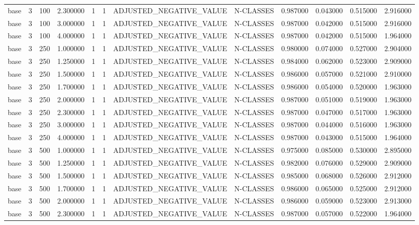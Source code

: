 \begin{tabular}{lrrrllllrrrr}
base & 3 & 100 & 2.300000 & 1 & 1 & ADJUSTED_NEGATIVE_VALUE & N-CLASSES & 0.987000 & 0.043000 & 0.515000 & 2.916000 \\
base & 3 & 100 & 3.000000 & 1 & 1 & ADJUSTED_NEGATIVE_VALUE & N-CLASSES & 0.987000 & 0.042000 & 0.515000 & 2.916000 \\
base & 3 & 100 & 4.000000 & 1 & 1 & ADJUSTED_NEGATIVE_VALUE & N-CLASSES & 0.987000 & 0.042000 & 0.515000 & 1.964000 \\
base & 3 & 250 & 1.000000 & 1 & 1 & ADJUSTED_NEGATIVE_VALUE & N-CLASSES & 0.980000 & 0.074000 & 0.527000 & 2.904000 \\
base & 3 & 250 & 1.250000 & 1 & 1 & ADJUSTED_NEGATIVE_VALUE & N-CLASSES & 0.984000 & 0.062000 & 0.523000 & 2.909000 \\
base & 3 & 250 & 1.500000 & 1 & 1 & ADJUSTED_NEGATIVE_VALUE & N-CLASSES & 0.986000 & 0.057000 & 0.521000 & 2.910000 \\
base & 3 & 250 & 1.700000 & 1 & 1 & ADJUSTED_NEGATIVE_VALUE & N-CLASSES & 0.986000 & 0.054000 & 0.520000 & 1.963000 \\
base & 3 & 250 & 2.000000 & 1 & 1 & ADJUSTED_NEGATIVE_VALUE & N-CLASSES & 0.987000 & 0.051000 & 0.519000 & 1.963000 \\
base & 3 & 250 & 2.300000 & 1 & 1 & ADJUSTED_NEGATIVE_VALUE & N-CLASSES & 0.987000 & 0.047000 & 0.517000 & 1.963000 \\
base & 3 & 250 & 3.000000 & 1 & 1 & ADJUSTED_NEGATIVE_VALUE & N-CLASSES & 0.987000 & 0.044000 & 0.516000 & 1.963000 \\
base & 3 & 250 & 4.000000 & 1 & 1 & ADJUSTED_NEGATIVE_VALUE & N-CLASSES & 0.987000 & 0.043000 & 0.515000 & 1.964000 \\
base & 3 & 500 & 1.000000 & 1 & 1 & ADJUSTED_NEGATIVE_VALUE & N-CLASSES & 0.975000 & 0.085000 & 0.530000 & 2.895000 \\
base & 3 & 500 & 1.250000 & 1 & 1 & ADJUSTED_NEGATIVE_VALUE & N-CLASSES & 0.982000 & 0.076000 & 0.529000 & 2.909000 \\
base & 3 & 500 & 1.500000 & 1 & 1 & ADJUSTED_NEGATIVE_VALUE & N-CLASSES & 0.985000 & 0.068000 & 0.526000 & 2.912000 \\
base & 3 & 500 & 1.700000 & 1 & 1 & ADJUSTED_NEGATIVE_VALUE & N-CLASSES & 0.986000 & 0.065000 & 0.525000 & 2.912000 \\
base & 3 & 500 & 2.000000 & 1 & 1 & ADJUSTED_NEGATIVE_VALUE & N-CLASSES & 0.986000 & 0.059000 & 0.523000 & 2.913000 \\
base & 3 & 500 & 2.300000 & 1 & 1 & ADJUSTED_NEGATIVE_VALUE & N-CLASSES & 0.987000 & 0.057000 & 0.522000 & 1.964000 \\

\end{tabular}
